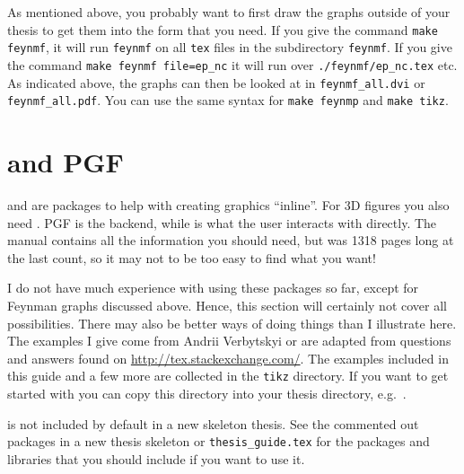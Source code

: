 As mentioned above, you probably want to first draw the graphs outside
of your thesis to get them into the form that you need. If you give
the command \texttt{make feynmf}, it will run \texttt{feynmf} on all
\texttt{tex} files in the subdirectory \texttt{feynmf}. If you give
the command \texttt{make feynmf file=ep\_nc} it will run over
\texttt{./feynmf/ep\_nc.tex} etc. As indicated above, the graphs can
then be looked at in \texttt{feynmf\_all.dvi} or\\
\texttt{feynmf\_all.pdf}. You can use the same syntax for
\texttt{make feynmp} and \texttt{make tikz}.


\section{\TikZ and PGF}%
\label{sec:fig:tikz}

 and \Package{\TikZ} are packages to help with
creating graphics \enquote{inline}.
For 3D figures you also need .
PGF is the backend, while \TikZ is what the user interacts with directly.
The manual contains all the information you should need,
but was 1318 pages long at the last count,
so it may not to be too easy to find what you want!

I do not have much experience with using these packages so far,
except for Feynman graphs discussed above.
Hence, this section will certainly not cover all possibilities. There may
also be better ways of doing things than I illustrate here. The
examples I give come from Andrii Verbytskyi or are adapted from
questions and answers found on
\url{http://tex.stackexchange.com/}.
The examples included in this
guide and a few more are collected in the \texttt{tikz} directory.
If you want to get started with \TikZ you can copy this directory
into your thesis directory, e.g.\ .

\TikZ is not included by default in a new skeleton thesis. See the
commented out packages in a new thesis skeleton or
\texttt{thesis\_guide.tex} for the packages and \TikZ libraries that
you should include if you want to use it.

